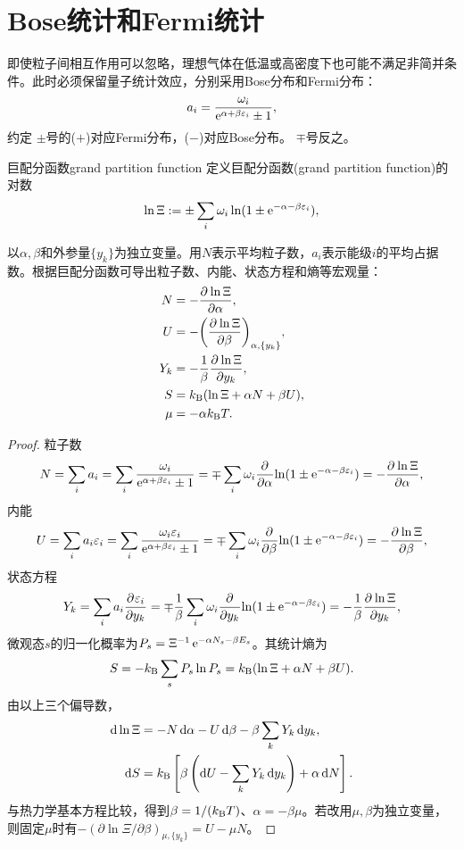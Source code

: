 \chapter{Bose统计和Fermi统计}

即使粒子间相互作用可以忽略，理想气体在低温或高密度下也可能不满足非简并条件。此时必须保留量子统计效应，分别采用Bose分布和Fermi分布：
\begin{equation}
	a_i = \frac{\omega_i}{\mathop{}\!\mathrm{e}^{\alpha+\beta\varepsilon_i} \pm 1},
\end{equation}
约定
$\pm$号的($+$)对应Fermi分布，($-$)对应Bose分布。
$\mp$号反之。

\begin{definition}{巨配分函数}{grand partition function}
	定义巨配分函数(grand partition function)的对数
	\begin{equation}
		\ln\Xi := \pm\sum_i\omega_i\ln(1 \pm \mathop{}\!\mathrm{e}^{-\alpha-\beta\varepsilon_i}),
	\end{equation}
\end{definition}

\begin{corollary}
	以$\alpha,\beta$和外参量$\{y_k\}$为独立变量。用$N$表示平均粒子数，$a_i$表示能级$i$的平均占据数。根据巨配分函数可导出粒子数、内能、状态方程和熵等宏观量：
	\begin{subequations}
		\begin{align}
			N &= -\frac{\partial^{}\ln\Xi}{\partial{\alpha}^{}},\\
			U &= -\biggl(\frac{\partial^{}\ln\Xi}{\partial{\beta}^{}}\biggr)_{\alpha,\{y_k\}},\\
			Y_k &= -\frac1\beta\frac{\partial^{}\ln\Xi}{\partial{y_k}^{}},\\
			S &= k_{\mathrm{B}}(\ln\Xi + \alpha N + \beta U),\\
			\mu &= -\alpha k_{\mathrm{B}} T.
		\end{align}
	\end{subequations}
\end{corollary}

\begin{proof}
	粒子数
	\[
		N = \sum_i a_i = \sum_i\frac{\omega_i}{\mathop{}\!\mathrm{e}^{\alpha+\beta\varepsilon_i} \pm 1} = \mp\sum_i\omega_i\frac{\partial^{}}{\partial{\alpha}^{}}{\ln(1 \pm \mathop{}\!\mathrm{e}^{-\alpha-\beta\varepsilon_i})} = -\frac{\partial^{}\ln\Xi}{\partial{\alpha}^{}},
	\]
	内能
	\[
		U = \sum_i a_i\varepsilon_i = \sum_i\frac{\omega_i\varepsilon_i}{\mathop{}\!\mathrm{e}^{\alpha+\beta\varepsilon_i} \pm 1} = \mp\sum_i\omega_i\frac{\partial^{}}{\partial{\beta}^{}}{\ln(1 \pm \mathop{}\!\mathrm{e}^{-\alpha-\beta\varepsilon_i})} = -\frac{\partial^{}\ln\Xi}{\partial{\beta}^{}},
	\]
	状态方程
	\[
		Y_k = \sum_i a_i\frac{\partial^{}\varepsilon_i}{\partial{y_k}^{}} = \mp\frac1\beta\sum_i\omega_i\frac{\partial^{}}{\partial{y_k}^{}}{\ln(1 \pm \mathop{}\!\mathrm{e}^{-\alpha-\beta\varepsilon_i})} = -\frac1\beta\frac{\partial^{}\ln\Xi}{\partial{y_k}^{}},
	\]
	微观态$s$的归一化概率为$P_s = \Xi^{-1}\mathop{}\!\mathrm{e}^{-\alpha N_s-\beta E_s}$。其统计熵为
	\[
		S = -k_{\mathrm{B}}\sum_s P_s\ln P_s = k_{\mathrm{B}}(\ln\Xi + \alpha N + \beta U).
	\]
	由以上三个偏导数，
	\begin{align*}
		\d\ln\Xi &= -N\d\alpha - U\d\beta - \beta\sum_k Y_k\d y_k,\\
		\d S &= \kB\left[\beta\left(\d U - \sum_kY_k\d y_k\right) + \alpha\d N\right].
	\end{align*}
	与热力学基本方程比较，得到$\beta = 1/(k_{\mathrm{B}} T)$、$\alpha = -\beta\mu$。若改用$\mu,\beta$为独立变量，则固定$\mu$时有$-(\partial\ln\Xi/\partial\beta)_{\mu,\{y_k\}} = U - \mu N$。
\end{proof}

